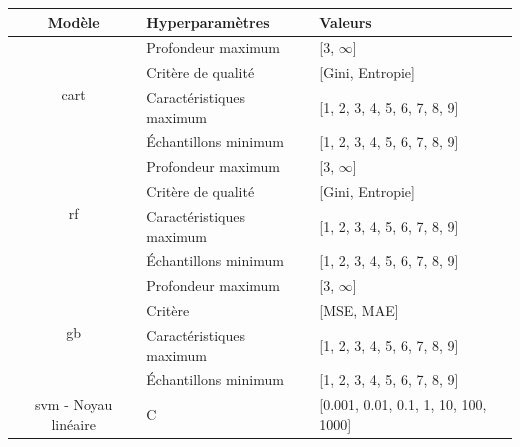 \begin{table}[H]
    \centering
    \begin{tabular}{cll}
        \toprule
        \textbf{Modèle}                                 & \textbf{Hyperparamètres}  & \textbf{Valeurs}                          \\ \midrule
        \multirow{4}{*}{\gls{cart}}                     & Profondeur maximum        & [3, $\infty$]                             \\ \cmidrule{2-3} 
                                                        & Critère de qualité        & [Gini, Entropie]                          \\ \cmidrule{2-3}   
                                                        & Caractéristiques maximum  & [1, 2, 3, 4, 5, 6, 7, 8, 9]               \\ \cmidrule{2-3}   
                                                        & Échantillons minimum      & [1, 2, 3, 4, 5, 6, 7, 8, 9]               \\ \midrule 
        \multirow{4}{*}{\gls{rf}}                       & Profondeur maximum        & [3, $\infty$]                             \\ \cmidrule{2-3} 
                                                        & Critère de qualité        & [Gini, Entropie]                          \\ \cmidrule{2-3}   
                                                        & Caractéristiques maximum  & [1, 2, 3, 4, 5, 6, 7, 8, 9]               \\ \cmidrule{2-3}   
                                                        & Échantillons minimum      & [1, 2, 3, 4, 5, 6, 7, 8, 9]               \\ \midrule 
        \multirow{4}{*}{\gls{gb}}                       & Profondeur maximum        & [3, $\infty$]                             \\ \cmidrule{2-3}
                                                        & Critère                   & [MSE, MAE]                                \\ \cmidrule{2-3} 
                                                        & Caractéristiques maximum  & [1, 2, 3, 4, 5, 6, 7, 8, 9]               \\ \cmidrule{2-3}   
                                                        & Échantillons minimum      & [1, 2, 3, 4, 5, 6, 7, 8, 9]               \\ \midrule 
        \gls{svm} - Noyau linéaire                      & C                         & [0.001, 0.01, 0.1, 1, 10, 100, 1000]      \\ \midrule

\end{tabular}
\end{table}
